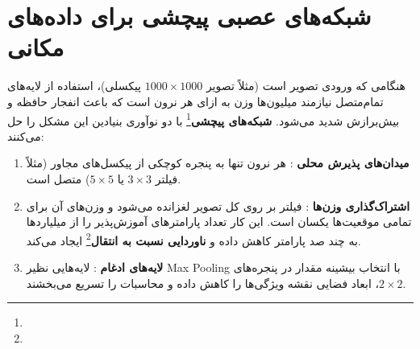 \section{شبکه‌های عصبی پیچشی \texorpdfstring{}{(CNN)} برای داده‌های مکانی}
هنگامی که ورودی تصویر است (مثلاً تصویر $1000 \times 1000$ پیکسلی)، استفاده از لایه‌های تمام‌متصل نیازمند میلیون‌ها وزن به ازای هر نرون است که باعث انفجار حافظه و بیش‌برازش شدید می‌شود.
\textbf{شبکه‌های پیچشی}\footnote{} با دو نوآوری بنیادین این مشکل را حل می‌کنند:
\begin{enumerate}
    \item \textbf{میدان‌های پذیرش محلی }: هر نرون تنها به پنجره کوچکی از پیکسل‌های مجاور (مثلاً فیلتر $3 \times 3$ یا $5 \times 5$) متصل است.
    \item \textbf{اشتراک‌گذاری وزن‌ها }: فیلتر بر روی کل تصویر لغزانده می‌شود و وزن‌های آن برای تمامی موقعیت‌ها یکسان است. این کار تعداد پارامترهای آموزش‌پذیر را از میلیاردها به چند صد پارامتر کاهش داده و \textbf{ناوردایی نسبت به انتقال}\footnote{} ایجاد می‌کند.
    \item \textbf{لایه‌های ادغام }: لایه‌هایی نظیر Max Pooling با انتخاب بیشینه مقدار در پنجره‌های $2 \times 2$، ابعاد فضایی نقشه ویژگی‌ها را کاهش داده و محاسبات را تسریع می‌بخشند.
\end{enumerate}

